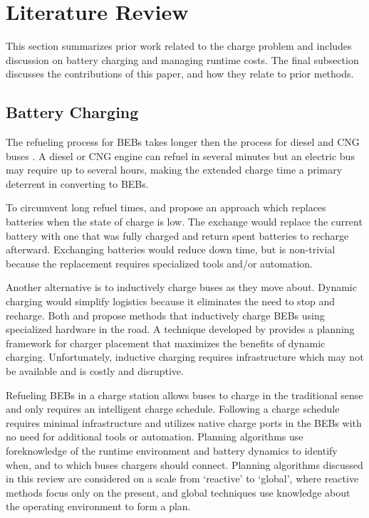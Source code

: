 \section{Literature Review}
\par This section summarizes prior work related to the charge problem and includes discussion on battery charging and managing runtime costs. The final subsection discusses the contributions of this paper, and how they relate to prior methods.
\subsection{Battery Charging}
The refueling process for BEBs takes longer then the process for diesel and CNG buses \cite{wei_optimizing_2018}. A diesel or CNG engine can refuel in several minutes but an electric bus may require up to several hours, making the extended charge time a primary deterrent in converting to BEBs.
\par To circumvent long refuel times, \cite{xian_zhang_optimal_2016} and \cite{jain_battery_2020} propose an approach which replaces batteries when the state of charge is low. The exchange would replace the current battery with one that was fully charged and return spent batteries to recharge afterward. Exchanging batteries would reduce down time, but is non-trivial because the replacement requires specialized tools and/or automation.  
\par Another alternative is to inductively charge buses as they move about. Dynamic charging would simplify logistics because it eliminates the need to stop and recharge. Both \cite{balde_electric_2019} and \cite{jeong_automatic_2018} propose methods that inductively charge BEBs using specialized hardware in the road. A technique developed by \cite{csonka_optimization_2021} provides a planning framework for charger placement that maximizes the benefits of dynamic charging. Unfortunately, inductive charging requires infrastructure which may not be available and is costly and disruptive.
\par Refueling BEBs in a charge station allows buses to charge in the traditional sense and only requires an intelligent charge schedule. Following a charge schedule requires minimal infrastructure and utilizes native charge ports in the BEBs with no need for additional tools or automation. Planning algorithms use foreknowledge of the runtime environment and battery dynamics to identify when, and to which buses chargers should connect. Planning algorithms discussed in this review are considered on a scale from `reactive' to `global', where reactive methods focus only on the present, and global techniques use knowledge about the operating environment to form a plan.
